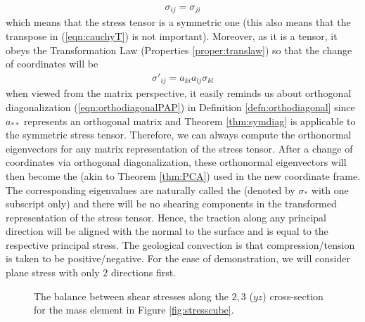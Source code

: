 \begin{align}
\sigma_{ij} = \sigma_{ji}
\end{align}
which means that the stress tensor is a symmetric one (this also means that the transpose in (\ref{eqn:cauchyT}) is not important). Moreover, as it is a tensor, it obeys the Transformation Law (Properties \ref{proper:translaw}) so that the change of coordinates will be
\begin{align}
\sigma'_{ij} = a_{ki}a_{lj}\sigma_{kl}
\end{align}
when viewed from the matrix perspective, it easily reminds us about orthogonal diagonalization (\ref{eqn:orthodiagonalPAP}) in Definition \ref{defn:orthodiagonal} since $a_{**}$ represents an orthogonal matrix and Theorem \ref{thm:symdiag} is applicable to the symmetric stress tensor. Therefore, we can always compute the orthonormal eigenvectors for any matrix representation of the stress tensor. After a change of coordinates via orthogonal diagonalization, these orthonormal eigenvectors will then become the  (akin to Theorem \ref{thm:PCA}) used in the new coordinate frame. The corresponding eigenvalues are naturally called the  (denoted by $\sigma_{*}$ with one subscript only) and there will be no shearing components in the transformed representation of the stress tensor. Hence, the traction along any principal direction will be aligned with the normal to the surface and is equal to the respective principal stress. The geological convection is that compression/tension is taken to be positive/negative. For the ease of demonstration, we will consider plane stress with only $2$ directions first.

\begin{figure}
    \centering
    \caption{The balance between shear stresses along the $2,3$ ($yz$) cross-section for the mass element in Figure \ref{fig:stresscube}.}
    \label{fig:stresspiped}
\end{figure}

